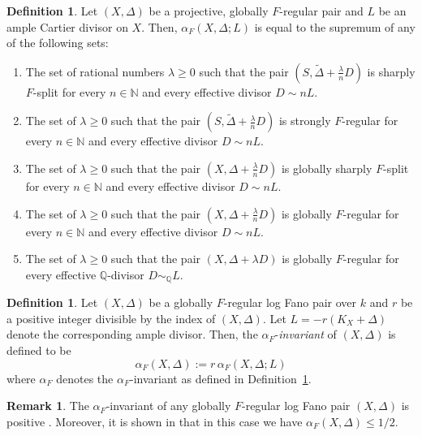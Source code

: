 \documentclass[11pt,reqno]{amsart}
\newcommand{\Q}{\mathbb{Q}}
\newcommand{\N}{\mathbb{N}}
\numberwithin{equation}{section}
\theoremstyle{definition}
\newtheorem{rem}[prop] {Remark}
\newtheorem{defi}[prop] {Definition}
\newcommand{\FA}{\alpha_{F}}
\begin{document}
\begin{defi}{\cite[Lemma 3.7]{PandeFrobeniusAlpha}}  \label{alphadefinitions}
 Let $(X, \Delta)$ be a projective, globally $F$-regular pair and $L$ be an ample Cartier divisor on $X$. Then, $\FA(X, \Delta; L)$ is equal to the supremum of any of the following sets:
 \begin{enumerate}
     \item The set of rational numbers $\lambda \geq 0$ such that the pair $(S, \tilde{\Delta} + \frac{\lambda}{n} D)$ is sharply $F$-split for every $n \in \N$ and every effective divisor $D \sim nL$.
     \item The set of $\lambda \geq 0$ such that the pair $(S, \tilde{\Delta} + \frac{\lambda}{n} D)$ is strongly $F$-regular for every $n \in \N$ and every effective divisor $D \sim nL$.
     \item The set of $\lambda \geq 0$ such that the pair $(X, \Delta +\frac{\lambda}{n} D)$ is globally sharply $F$-split for every $n \in \N$ and every effective divisor $D \sim nL$.
     \item The set of $\lambda \geq 0$ such that the pair $(X, \Delta+\frac{\lambda}{n} D)$ is globally $F$-regular for every $n \in \N$ and every effective divisor $D \sim nL$.
     \item The set of $\lambda \geq 0$ such that the pair $(X, \Delta + \lambda D)$ is globally $F$-regular for every effective $\Q$-divisor $D \sim_\Q L$.
 \end{enumerate}
\end{defi}


\begin{defi} \label{FAXdfn}
    Let $(X, \Delta)$ be a globally $F$-regular log Fano pair over $k$ and $r$ be a positive integer divisible by the index of $(X, \Delta)$. Let $L = -r(K_X + \Delta)$ denote the corresponding ample divisor. Then, the $\FA$-\emph{invariant} of $(X, \Delta)$ is defined to be
    $$ \FA (X, \Delta) := r \, \FA (X, \Delta; L ) $$
    where $\FA$ denotes the $\FA$-invariant as defined in Definition~\ref{alphadefinitions}.
\end{defi}

\begin{rem}
    The $\FA$-invariant of any globally $F$-regular log Fano pair $(X, \Delta)$ is positive \cite[Theorem 4.6]{PandeFrobeniusAlpha}. Moreover, it is shown in \cite[Theorem 5.5]{PandeFrobeniusAlpha} that in this case we have $\FA(X, \Delta)  \leq 1/2$.
\end{rem}
\end{document}
